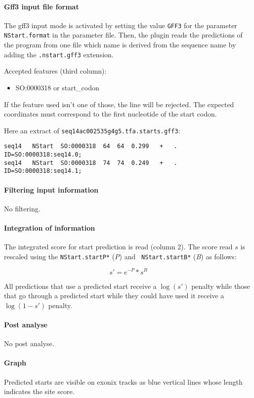 \paragraph{Gff3 input file format}

The gff3 input mode is activated by setting the value \texttt{GFF3}
for the parameter \texttt{NStart.format} in the parameter file.  Then,
the plugin reads the predictions of the program from one file which
name is derived from the sequence name by adding the
\texttt{.nstart.gff3} extension.

Accepted features (third column):\\
\begin{itemize}
\item  SO:0000318 or start\_codon
\end{itemize}

If the feature used isn't one of those, the line will be rejected. The
expected coordinates must correspond to the first nucleotide of the
start codon.

Here an extract of \texttt{seq14ac002535g4g5.tfa.starts.gff3}:
\begin{Verbatim}[fontsize=\tiny]
seq14	NStart	SO:0000318	64	64	0.299	+	.	ID=SO:0000318:seq14.0;
seq14	NStart	SO:0000318	74	74	0.249	+	.	ID=SO:0000318:seq14.1;
\end{Verbatim}


\paragraph{Filtering input information}

No filtering.

\paragraph{Integration of information}

The integrated score for start prediction is read (column 2).  The
score read $s$ is rescaled using the {\tt NStart.startP*} (\emph{P}) and {\tt
NStart.startB*} (\emph{B}) as follows:

\[s' = e^{-P}*s^B\]

All predictions that use a predicted start receive a $\log(s')$
penalty while those that go through a predicted start while they
could have used it receive a $\log(1-s')$ penalty.


\paragraph{Post analyse}

No post analyse.

\paragraph{Graph}

Predicted starts are visible on exonix tracks as blue vertical lines
whose length indicates the site score.






